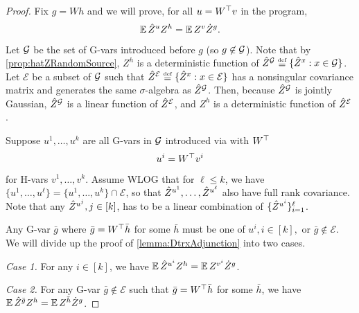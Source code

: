 \documentclass[main.tex]{subfiles}
\begin{document}
\begin{proof}
  \newcommand{\xx}{x}
  \newcommand{\Ee}{\mathcal{E}}
  \newcommand{\uu}{u}
  \newcommand{\vv}{v}
  \newcommand{\Ff}{\mathcal{F}}
  Fix $g=Wh$ and we will prove, for all $u = W^\top v$ in the program,
  \begin{align*}
    \operatorname*{\mathbb{E}} \hat Z^{u} Z^h = \operatorname*{\mathbb{E}} Z^{v} \dot Z^g.
  \end{align*}
  Let $\mathcal G$ be the set of G-vars introduced before $g$ (so $g\not\in\mathcal G$).
  Note that by \cref{prop:hatZRandomSource}, $Z^h$ is a deterministic function of $\Zhat^\Gg \defeq \{\Zhat^{x}: x \in \Gg\}$.
  Let $\Ee$ be a subset of $\mathcal G$ such that $\Zhat^{\Ee} \defeq \{\Zhat^{x}: x \in \Ee\}$ has a nonsingular covariance matrix and generates the same $\sigma$-algebra as $\hat Z^\mathcal G$.
  Then, because $\hat Z^\mathcal G$ is jointly Gaussian, $\hat Z^\mathcal G$ is a linear function of $\Zhat^\Ee$, and $Z^h$ is a deterministic function of $\Zhat^\Ee$.

  Suppose $\uu^1, \ldots, \uu^k$ are all G-vars in $\mathcal G$ introduced via  with $W^\top$
  \[\uu^i = W^\trsp \vv^i \]
  for H-vars $\vv^1, \ldots, \vv^k$.
  Assume WLOG that for $\ell \le k$, we have $\{\uu^1, \ldots, \uu^{\ell}\} = \{\uu^1, \ldots, \uu^{k}\} \cap \Ee$, so that $\Zhat^{\uu^{1}}, \ldots, \Zhat^{\uu^{{\ell}}}$ also have full rank covariance.
  Note that any $\Zhat^{\uu^{j}}, j \in [k]$, has to be a linear combination of $\{\Zhat^{\uu^i}\}_{i=1}^{\ell}$.

  Any G-var $\bar g$ where $\bar g = W^\top \bar h$ for some $\bar h$ must be one of $u^i, i\in[k],$ or $\bar g \not\in\Ee$.
  We will divide up the proof of \cref{lemma:DtrxAdjunction} into two cases.

  \emph{Case 1.} For any $i \in [k]$, we have $\EV \Zhat^{\uu^{i}} Z^{h} = \EV Z^{\vv^{i}} \Zdot^{g}$.

  \emph{Case 2.} For any G-var $\bar g \not \in \Ee$ such that $\bar g = W^\top \bar h$ for some $\bar h$, we have $\operatorname*{\mathbb{E}}  \hat Z^{\bar g} Z^{h}  = \operatorname*{\mathbb{E}}   Z^{\bar h} \dot Z^{g} $.


\end{proof}
\end{document}
